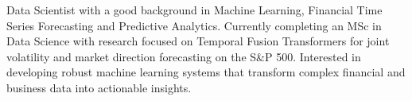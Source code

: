 \resumespace
Data Scientist with a good background in Machine Learning, Financial Time Series Forecasting and Predictive Analytics. Currently completing an MSc in Data Science with research focused on Temporal Fusion Transformers for joint volatility and market direction forecasting on the S\&P 500. Interested in developing robust machine learning systems that transform complex financial and business data into actionable insights.
